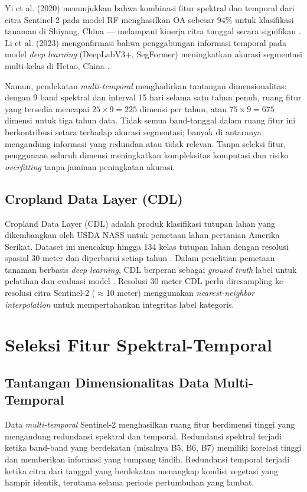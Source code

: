 Yi et al. (2020) menunjukkan bahwa kombinasi fitur spektral dan temporal dari citra Sentinel-2 pada model RF menghasilkan OA sebesar 94\% untuk klasifikasi tanaman di Shiyang, China — melampaui kinerja citra tunggal secara signifikan \citep{yi2020}.
Li et al. (2023) mengonfirmasi bahwa penggabungan informasi temporal pada model \textit{deep learning} (DeepLabV3+, SegFormer) meningkatkan akurasi segmentasi multi-kelas di Hetao, China \citep{li2023}.

Namun, pendekatan \textit{multi-temporal} menghadirkan tantangan dimensionalitas: dengan 9 band spektral dan interval 15 hari selama satu tahun penuh, ruang fitur yang tersedia mencapai $25 \times 9 = 225$ dimensi per tahun, atau $75 \times 9 = 675$ dimensi untuk tiga tahun data.
Tidak semua band-tanggal dalam ruang fitur ini berkontribusi setara terhadap akurasi segmentasi; banyak di antaranya mengandung informasi yang redundan atau tidak relevan.
Tanpa seleksi fitur, penggunaan seluruh dimensi meningkatkan kompleksitas komputasi dan risiko \textit{overfitting} tanpa jaminan peningkatan akurasi.

\subsection{Cropland Data Layer (CDL)}
Cropland Data Layer (CDL) adalah produk klasifikasi tutupan lahan yang dikembangkan oleh USDA NASS untuk pemetaan lahan pertanian Amerika Serikat.
Dataset ini mencakup hingga 134 kelas tutupan lahan dengan resolusi spasial 30 meter dan diperbarui setiap tahun \citep{copenhaver2021}.
Dalam penelitian pemetaan tanaman berbasis \textit{deep learning}, CDL berperan sebagai \textit{ground truth} label untuk pelatihan dan evaluasi model \citep{tran2022, maleki2024}.
Resolusi 30 meter CDL perlu diresampling ke resolusi citra Sentinel-2 ($\approx$10 meter) menggunakan \textit{nearest-neighbor interpolation} untuk mempertahankan integritas label kategoris.

\section{Seleksi Fitur Spektral-Temporal}
\subsection{Tantangan Dimensionalitas Data Multi-Temporal}
Data \textit{multi-temporal} Sentinel-2 menghasilkan ruang fitur berdimensi tinggi yang mengandung redundansi spektral dan temporal.
Redundansi spektral terjadi ketika band-band yang berdekatan (misalnya B5, B6, B7) memiliki korelasi tinggi dan memberikan informasi yang tumpang tindih.
Redundansi temporal terjadi ketika citra dari tanggal yang berdekatan menangkap kondisi vegetasi yang hampir identik, terutama selama periode pertumbuhan yang lambat.

